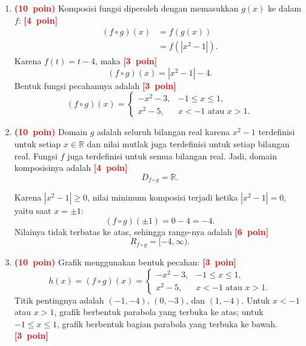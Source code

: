 \documentclass[12pt,a4paper]{article}
\newcommand{\bobot}[1]{\mbox{\textcolor{red}{\textbf{(#1 poin)}}}}
\newcommand{\poin}[1]{\mbox{\textcolor{red}{\textbf{[#1 poin]}}}}
\begin{document}
\begin{enumerate}
        \begin{enumerate}[label=\alph*.]
          \item \bobot{10} Komposisi fungsi diperoleh dengan memasukkan
                $g(x)$ ke dalam $f$:
                \poin{4}
                \begin{align*}
                  (f\circ g)(x)&=f(g(x))\\
                                &=f(|x^2-1|).
                \end{align*}
                Karena $f(t)=t-4$, maka \poin{3}
                \[
                  \boxed{(f\circ g)(x)=|x^2-1|-4}.
                \]
                Bentuk fungsi pecahannya adalah \poin{3}
                \[
                  (f\circ g)(x)=
                  \begin{cases}
                    -x^2-3, & -1\leq x\leq 1,\\
                    x^2-5, & x<-1\text{ atau }x>1.
                  \end{cases}
                \]

          \item \bobot{10} Domain $g$ adalah seluruh bilangan real karena
                $x^2-1$ terdefinisi untuk setiap $x\in\mathbb{R}$ dan nilai
                mutlak juga terdefinisi untuk setiap bilangan real.
                Fungsi $f$ juga terdefinisi untuk semua bilangan real.
                Jadi, domain komposisinya adalah \poin{4}
                \[
                  \boxed{D_{f\circ g}=\mathbb{R}}.
                \]

                Karena $|x^2-1|\geq 0$, nilai minimum komposisi terjadi
                ketika $|x^2-1|=0$, yaitu saat $x=\pm1$:
                \[
                  (f\circ g)(\pm1)=0-4=-4.
                \]
                Nilainya tidak terbatas ke atas, sehingga range-nya adalah
                \poin{6}
                \[
                  \boxed{R_{f\circ g}=[-4,\infty)}.
                \]

          \item \bobot{10} Grafik menggunakan bentuk pecahan:
                \poin{3}
                \[
                  h(x)=(f\circ g)(x)=
                  \begin{cases}
                    -x^2-3, & -1\leq x\leq 1,\\
                    x^2-5, & x<-1\text{ atau }x>1.
                  \end{cases}
                \]
                Titik pentingnya adalah
                $(-1,-4)$, $(0,-3)$, dan $(1,-4)$.
                Untuk $x<-1$ atau $x>1$, grafik berbentuk parabola yang
                terbuka ke atas; untuk $-1\leq x\leq1$, grafik berbentuk
                bagian parabola yang terbuka ke bawah. \poin{3}


\end{enumerate}
\end{enumerate}
\end{document}
